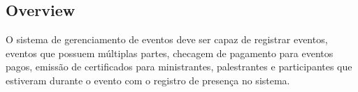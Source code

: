 \subsection{Overview}
O sistema de gerenciamento de eventos deve ser capaz de registrar eventos, eventos que possuem múltiplas partes, checagem de pagamento para eventos pagos, emissão de certificados para ministrantes, palestrantes e participantes que estiveram durante o evento com o registro de presença no sistema.
